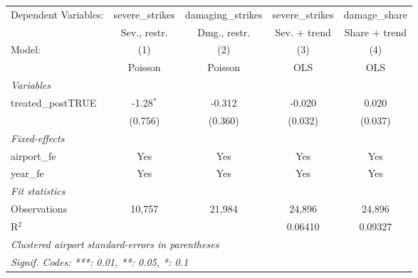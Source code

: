 
\begingroup
\centering
\scriptsize
\begin{tabular}{lcccc}
   \tabularnewline \midrule \midrule
   Dependent Variables: & severe\_strikes    & damaging\_strikes    & severe\_strikes  & damage\_share\\   
                        & Sev., restr.       & Dmg., restr.         & Sev. + trend     & Share + trend \\   
   Model:               & (1)                & (2)                  & (3)              & (4)\\  
                        &  Poisson           & Poisson              & OLS              & OLS\\  
   \midrule
   \emph{Variables}\\
   treated\_postTRUE    & -1.28$^{*}$        & -0.312               & -0.020           & 0.020\\   
                        & (0.756)            & (0.360)              & (0.032)          & (0.037)\\   
   \midrule
   \emph{Fixed-effects}\\
   airport\_fe          & Yes                & Yes                  & Yes              & Yes\\  
   year\_fe             & Yes                & Yes                  & Yes              & Yes\\  
   \midrule
   \emph{Fit statistics}\\
   Observations         & 10,757             & 21,984               & 24,896           & 24,896\\  
   R$^2$                &                    &                      & 0.06410          & 0.09327\\  
   \midrule \midrule
   \multicolumn{5}{l}{\emph{Clustered airport standard-errors in parentheses}}\\
   \multicolumn{5}{l}{\emph{Signif. Codes: ***: 0.01, **: 0.05, *: 0.1}}\\
\end{tabular}
\par\endgroup

